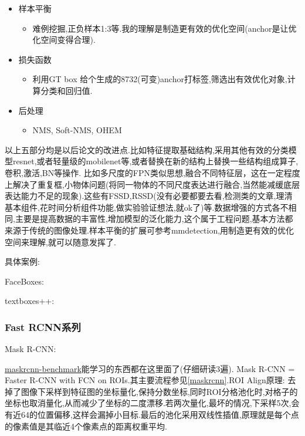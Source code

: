 \documentclass[UTF8]{ctexart}
\begin{document}
\begin{itemize}
	\item 样本平衡
	\begin{itemize}
		\item 难例挖掘,正负样本1:3等.我的理解是制造更有效的优化空间(anchor是让优化空间变得合理).
	\end{itemize}
	
	\item 损失函数 
	\begin{itemize}
		\item 利用GT box 给个生成的8732(可变)anchor打标签,筛选出有效优化对象,计算分类和回归值.
	\end{itemize}

	\item 后处理
	\begin{itemize}
		\item NMS, Soft-NMS, OHEM
	\end{itemize}

\end{itemize}

以上五部分均是以后论文的改进点.比如特征提取基础结构,采用其他有效的分类模型resnet,或者轻量级的mobilenet等,或者替换在新的结构上替换一些结构组成算子,卷积,激活,BN等操作. 比如多尺度的FPN类似思想,融合不同特征层，这在一定程度上解决了重复框,小物体问题(将同一物体的不同尺度表达进行融合,当然能减缓底层表达能力不足的现象).这些有FSSD,RSSD(没有必要都要去看,检测类的文章,理清基本组件,花时间分析组件功能,做实验验证想法,就ok了)等.数据增强的方式各不相同,主要是提高数据的丰富性,增加模型的泛化能力,这个属于工程问题,基本方法都来源于传统的图像处理.样本平衡的扩展可参考mmdetection,用制造更有效的优化空间来理解,就可以随意发挥了.

具体案例:

FaceBoxes:

textboxes++:


\subsubsection{Fast RCNN系列}
Mask R-CNN:

\href{https://github.com/facebookresearch/maskrcnn-benchmark}{maskrcnn-benchmark}能学习的东西都在这里面了(仔细研读3遍). 
Mask R-CNN = Faster R-CNN  with FCN on ROIs.其主要流程参见\ref{maskrcnn}.ROI Align原理:
去掉了图像下采样到特征图的坐标量化,保持分数坐标,同时ROI分格池化时,对格子的坐标也取消量化,从而减少了坐标的二度漂移.若两次量化,最坏的情况,下采样5次,会有近64的位置偏移,这样会漏掉小目标.最后的池化采用双线性插值,原理就是每个点的像素值是其临近4个像素点的距离权重平均.
\end{document}
